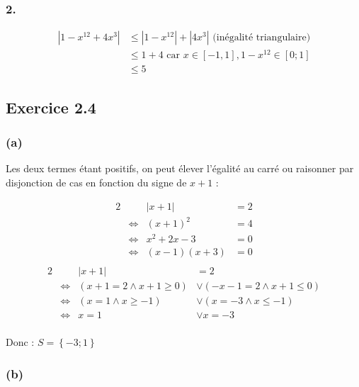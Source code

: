 \documentclass[a4paper,10pt]{report}
\begin{document}
\subsubsection*{2.}

\begin{equation*}
	\begin{split}
		|1-x^{12} +4x^3| &\leq |1- x^{12}|+ |4x^3| \text{ (inégalité triangulaire)} \\
		&\leq 1 + 4 \text{ car }x \in [-1, 1], 1- x^{12} \in [0 ; 1]\\
		& \leq 5
	\end{split}
\end{equation*}


\subsection*{Exercice 2.4}

\subsubsection*{(a)}

Les deux termes étant positifs, on peut élever l'égalité au carré ou raisonner par disjonction de cas en fonction du signe de $x+1$ :

\begin{alignat*}{2}
	&                    & |x+1| &=2 \\
	&\Longleftrightarrow &(x+1)^2 &= 4 \\
	&\Longleftrightarrow & x^2 +2x -3 &= 0 \\
	&\Longleftrightarrow & (x-1)(x+3) &= 0 \\
\end{alignat*}
\begin{alignat*}{2}
&                    & |x+1| &=2 \\
&\Longleftrightarrow &(x+1=2 \wedge x+1 \geq 0) &\vee (-x-1=2 \wedge x+1 \leq 0) \\
&\Longleftrightarrow &(x=1 \wedge x \geq -1) &\vee (x=-3 \wedge x \leq -1) \\
&\Longleftrightarrow & x=1 &\vee x=-3 \\
\end{alignat*}

Donc : $S=\left\lbrace -3 ; 1 \right\rbrace$

\subsubsection*{(b)}
\end{document}
